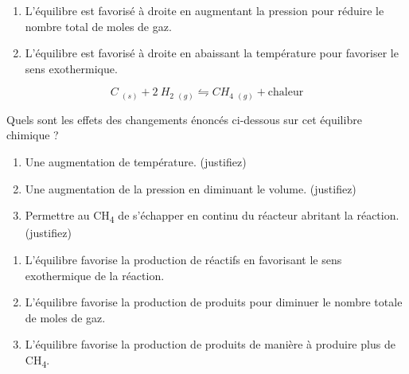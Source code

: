 \documentclass[
  11pt,
  french,
  a4paper,
  openany]{book}
\providecommand{\tightlist}{%
  \setlength{\itemsep}{0pt}\setlength{\parskip}{0pt}}
\begin{document}
\begin{Answer}

\begin{enumerate}
\def\labelenumi{\alph{enumi}.}
\tightlist
\item
  L'équilibre est favorisé à droite en augmentant la pression pour réduire le nombre total de moles de gaz.
\item
  L'équilibre est favorisé à droite en abaissant la température pour favoriser le sens exothermique.
\end{enumerate}


\end{Answer}

\clearpage

\begin{Exercise}

\[
  C\ _{(s)} + 2\ H_2\ _{(g)} \leftrightharpoons CH_4\ _{(g)} + \text{chaleur}
\]

Quels sont les effets des changements énoncés ci-dessous sur cet équilibre chimique ?

\begin{enumerate}
\def\labelenumi{\alph{enumi}.}
\tightlist
\item
  Une augmentation de température. (justifiez)
\item
  Une augmentation de la pression en diminuant le volume. (justifiez)
\item
  Permettre au CH\textsubscript{4} de s'échapper en continu du réacteur abritant la réaction. (justifiez)
\end{enumerate}


\end{Exercise}

\begin{Answer}

\begin{enumerate}
\def\labelenumi{\alph{enumi}.}
\tightlist
\item
  L'équilibre favorise la production de réactifs en favorisant le sens exothermique de la réaction.
\item
  L'équilibre favorise la production de produits pour diminuer le nombre totale de moles de gaz.
\item
  L'équilibre favorise la production de produits de manière à produire plus de CH\textsubscript{4}.
\end{enumerate}


\end{Answer}
\end{document}
